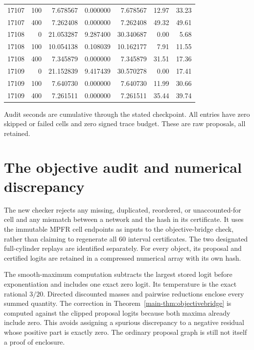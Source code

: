 \begin{table}[p]
\begin{tabular}{rrrrrrr}
17107 & 100 & 7.678567 & 0.000000 & 7.678567 & 12.97 & 33.23 \\
17107 & 400 & 7.262408 & 0.000000 & 7.262408 & 49.32 & 49.61 \\
17108 & 0 & 21.053287 & 9.287400 & 30.340687 & 0.00 & 5.68 \\
17108 & 100 & 10.054138 & 0.108039 & 10.162177 & 7.91 & 11.55 \\
17108 & 400 & 7.345879 & 0.000000 & 7.345879 & 31.51 & 17.36 \\
17109 & 0 & 21.152839 & 9.417439 & 30.570278 & 0.00 & 17.41 \\
17109 & 100 & 7.640730 & 0.000000 & 7.640730 & 11.99 & 30.66 \\
17109 & 400 & 7.261511 & 0.000000 & 7.261511 & 35.44 & 39.74 \\
\bottomrule\end{tabular}
\par\smallskip\footnotesize Audit seconds are cumulative through the stated checkpoint. All entries have zero skipped or failed cells and zero signed trace budget. These are raw proposals, all retained.
\end{table}

\clearpage
\section{The objective audit and numerical discrepancy}\label{supp:r18objective}
The new checker rejects any missing, duplicated, reordered, or unaccounted-for cell and any mismatch between a network and the hash in its certificate. It uses the immutable MPFR cell endpoints as inputs to the objective-bridge check, rather than claiming to regenerate all 60 interval certificates. The two designated full-cylinder replays are identified separately. For every object, its proposal and certified logits are retained in a compressed numerical array with its own hash.

The smooth-maximum computation subtracts the largest stored logit before exponentiation and includes one exact zero logit. Its temperature is the exact rational $3/20$. Directed discounted masses and pairwise reductions enclose every summed quantity. The correction in Theorem~\ref{main-thm:objectivebridge} is computed against the clipped proposal logits because both maxima already include zero. This avoids assigning a spurious discrepancy to a negative residual whose positive part is exactly zero. The ordinary proposal graph is still not itself a proof of enclosure.

